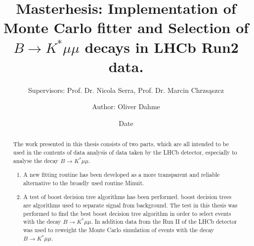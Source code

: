 \documentclass[english]{uzhpub}
\begin{document}
\title{Masterhesis:
Implementation of Monte Carlo fitter and Selection of $B \rightarrow K^* \mu \mu$ decays in LHCb Run2 data.}
\subtitle{Supervisors: Prof. Dr. Nicola Serra, Prof. Dr. Marcin Chrzs\k{a}szcz}

\author{Author: Oliver Dahme}
\date{Date}

\maketitle




\begin{abstract}
  The work presented in this thesis consists of two parts, which are all intended to be used in the contents of data analysis of data taken by the LHCb detector, especially to analyse the decay $B \rightarrow K^* \mu \mu$.
  \begin{enumerate}
    \item A new fitting routine has been developed as a more transparent and reliable alternative to the broadly used routine Minuit.
    \item A test of boost decision tree algorithms has been performed. boost decision trees are algorithms used to separate signal from background. The test in this thesis was performed to find the best boost decision tree algorithm in order to select events with the decay $B \rightarrow K^* \mu \mu$. In addition data from the Run II of the LHCb detector was used to reweight the Monte Carlo simulation of events with the decay $B \rightarrow K^* \mu \mu$.
  \end{enumerate}
\end{abstract}

\clearpage

\tableofcontents



\clearpage
\end{document}
